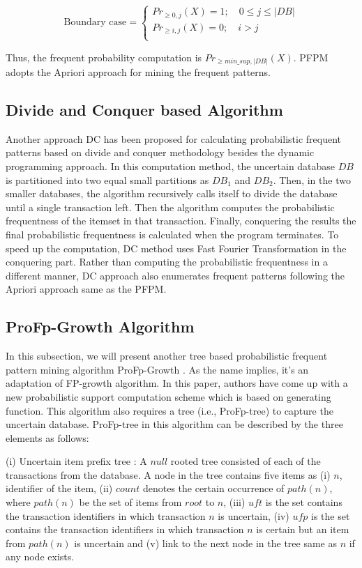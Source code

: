 \[
\textrm{Boundary case}=\left\{
                \begin{array}{ll}
                    Pr_{\geq 0,j}(X) = 1; \quad 0 \leq j \leq |DB|\\
                  Pr_{\geq i,j}(X) = 0; \quad i > j\\
                \end{array}
              \right.
\]

Thus, the frequent probability computation is $Pr_{\geq min\_sup,|DB|}(X)$. PFPM adopts the Apriori approach for mining the frequent patterns. 

\subsection{Divide and Conquer based Algorithm}
Another approach DC \cite{todis} has been proposed for calculating probabilistic frequent patterns based on divide and conquer methodology besides the dynamic programming approach. In this computation  method, the uncertain database $DB$ is partitioned into two equal small partitions as $DB_1$ and $DB_2$. Then, in the two smaller databases, the  algorithm recursively calls itself to divide the database until a single transaction left. Then the algorithm computes the probabilistic frequentness of the itemset in that transaction. Finally, conquering the results the final probabilistic frequentness is calculated when the program terminates. To speed up the computation, DC method uses Fast Fourier Transformation  in the conquering part. Rather than computing the probabilistic frequentness in a different manner, DC approach also enumerates frequent patterns following the Apriori approach same as the PFPM.

\subsection{ProFp-Growth Algorithm}
In this subsection, we will present another tree based probabilistic frequent pattern mining algorithm ProFp-Growth \cite{profp}. As the name implies, it's an adaptation of FP-growth algorithm. In this paper, authors have come up with a new probabilistic support computation scheme which is based on generating function. This algorithm also requires a tree (i.e., ProFp-tree) to capture the uncertain database. ProFp-tree in this algorithm can be described by the three elements as follows:

(i) Uncertain item prefix tree : A $null$ rooted tree consisted of each of the transactions from the database. A node in the tree contains five items as (i) $n$, identifier of the item, (ii)  $count$ denotes the certain occurrence of $path(n)$, where $path(n)$ be the set of items from $root$ to $n$, (iii) $uft$ is the set contains the transaction identifiers in which transaction $n$ is uncertain, (iv) $ufp$ is the set contains the transaction identifiers in which transaction $n$ is certain but an item from $path(n)$ is uncertain and (v) link to the next node in the tree same as $n$ if any node exists.

